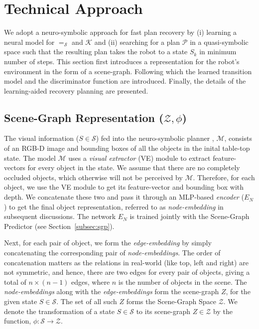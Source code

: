 \section{Technical Approach} \label{sec:approach}
%
We adopt a neuro-symbolic approach for fast plan recovery by (i) learning a neural model for  $=_\mathcal{S}$ and $\mathcal{K}$ and (ii) searching for a plan $\mathcal{P}$ in a quasi-symbolic space such that the resulting plan takes the robot to a state $S_k$ in minimum number of steps. This section first introduces a representation for the robot's environment in the form of a scene-graph. Following which the learned transition model and the discriminator function are introduced. Finally, the details of the learning-aided recovery planning are presented. 

\subsection{Scene-Graph Representation ($\mathcal{Z}, \phi$)}
\label{subsec:sgs}
The visual information ($S \in \mathcal{S}$) fed into the neuro-symbolic planner \cite{Kalithasan2022LearningNP}, $\mathcal{M}$, consists of an RGB-D image and bounding boxes of all the objects in the inital table-top state. The model $\mathcal{M}$ uses a \textit{visual extractor} (VE) module to extract feature-vectors for every object in the state. We assume that there are no completely occluded objects, which otherwise will not be perceived by $\mathcal{M}$. Therefore, for each object, we use the VE module to get its feature-vector and bounding box with depth. We concatenate these two and pass it through an MLP-based \textit{encoder} ($E_N$) to get the final object representation, referred to as \textit{node-embedding} in subsequent discussions. The network $E_N$ is trained jointly with the Scene-Graph Predictor (see Section~\ref{subsec:sgp}).

Next, for each pair of object, we form the \textit{edge-embedding} by simply concatenating the corresponding pair of \textit{node-embeddings}. The order of concatenation matters as the relations in real-world (like top, left and right) are not symmetric, and hence, there are two edges for every pair of objects, giving a total of $n \times (n - 1)$ edges, where $n$ is the number of objects in the scene. The \textit{node-embeddings} along with the \textit{edge-embeddings} form the scene-graph $Z$, for the given state $S \in \mathcal{S}$. The set of all such $Z$ forms the Scene-Graph Space $\mathcal{Z}$.
%
We denote the transformation of a state $S \in \mathcal{S}$ to its scene-graph $Z \in \mathcal{Z}$ by the function, $\phi: \mathcal{S} \rightarrow \mathcal{Z}$. 

